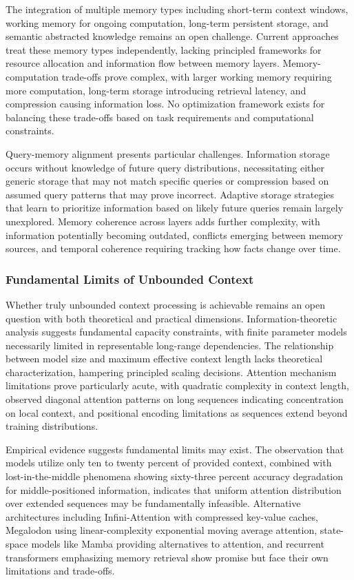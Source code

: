 The integration of multiple memory types including short-term context windows, working memory for ongoing computation, long-term persistent storage, and semantic abstracted knowledge remains an open challenge. Current approaches treat these memory types independently, lacking principled frameworks for resource allocation and information flow between memory layers. Memory-computation trade-offs prove complex, with larger working memory requiring more computation, long-term storage introducing retrieval latency, and compression causing information loss. No optimization framework exists for balancing these trade-offs based on task requirements and computational constraints.

Query-memory alignment presents particular challenges. Information storage occurs without knowledge of future query distributions, necessitating either generic storage that may not match specific queries or compression based on assumed query patterns that may prove incorrect. Adaptive storage strategies that learn to prioritize information based on likely future queries remain largely unexplored. Memory coherence across layers adds further complexity, with information potentially becoming outdated, conflicts emerging between memory sources, and temporal coherence requiring tracking how facts change over time.

\subsubsection{Fundamental Limits of Unbounded Context}

Whether truly unbounded context processing is achievable remains an open question with both theoretical and practical dimensions. Information-theoretic analysis suggests fundamental capacity constraints, with finite parameter models necessarily limited in representable long-range dependencies. The relationship between model size and maximum effective context length lacks theoretical characterization, hampering principled scaling decisions. Attention mechanism limitations prove particularly acute, with quadratic complexity in context length, observed diagonal attention patterns on long sequences indicating concentration on local context, and positional encoding limitations as sequences extend beyond training distributions.

Empirical evidence suggests fundamental limits may exist. The observation that models utilize only ten to twenty percent of provided context, combined with lost-in-the-middle phenomena showing sixty-three percent accuracy degradation for middle-positioned information, indicates that uniform attention distribution over extended sequences may be fundamentally infeasible. Alternative architectures including Infini-Attention with compressed key-value caches, Megalodon using linear-complexity exponential moving average attention, state-space models like Mamba providing alternatives to attention, and recurrent transformers emphasizing memory retrieval show promise but face their own limitations and trade-offs.

